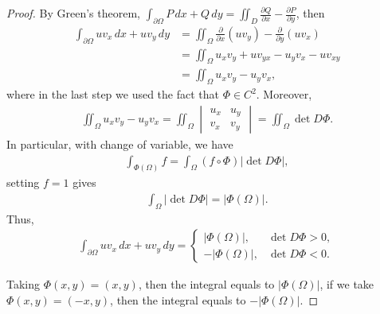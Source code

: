 \documentclass[12pt,leqno]{amsart}
\theoremstyle{definition}
\begin{document}
\begin{proof}
By Green's theorem, $\int_{\partial \Omega} P\, dx + Q\, dy = \iint_D \frac{\partial Q}{\partial x} - \frac{\partial P}{\partial y}$, then
\begin{align*}
    \int_{\partial\Omega} uv_x\, dx + uv_y\, dy & = \iint_\Omega \frac{\partial}{\partial x} \left(uv_y \right) - \frac{\partial}{\partial y} \left(uv_x \right) \\
    & = \iint_\Omega u_xv_y + u v_{yx} - u_y v_x - u v_{xy} \\
    & = \iint_\Omega u_xv_y - u_y v_x,
\end{align*}
where in the last step we used the fact that $\Phi \in C^2$. Moreover, 
\begin{align*}
    \iint_\Omega u_xv_y - u_y v_x = \iint_\Omega \begin{vmatrix}
        u_x & u_y \\
        v_x & v_y
    \end{vmatrix} = \iint_\Omega \det D\Phi.
\end{align*}
In particular, with change of variable, we have
\begin{align*}
    \int_{\Phi(\Omega)} f = \int_{\Omega} (f\circ \Phi) |\det D\Phi|,
\end{align*}
setting $f = 1$ gives
\begin{align*}
    \int_{\Omega} |\det D\Phi| = |\Phi(\Omega)|.
\end{align*}
Thus, 
\begin{align*}
    \int_{\partial\Omega} uv_x\, dx + uv_y\, dy = 
    \begin{cases}
        |\Phi(\Omega)|, & \det D\Phi > 0, \\
        - |\Phi(\Omega)|, & \det D\Phi < 0.
    \end{cases}
\end{align*}

Taking $\Phi(x,y) = (x,y)$, then the integral equals to $|\Phi(\Omega)|$, if we take $\Phi(x,y) = (-x,y)$, then the integral equals to $-|\Phi(\Omega)|$.
\end{proof}

\medskip
\end{document}
